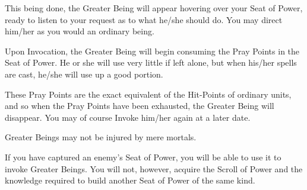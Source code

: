 This being done, the Greater Being will appear hovering over your Seat of Power, ready to listen to your request as to what he/she should do. You may direct him/her as you would an ordinary being.

Upon Invocation, the Greater Being will begin consuming the Pray Points in the Seat of Power. He or she will use very little if left alone, but when his/her spells are cast, he/she will use up a good portion.

These Pray Points are the exact equivalent of the Hit-Points of ordinary units, and so when the Pray Points have been exhausted, the Greater Being will disappear. You may of course Invoke him/her again at a later date.

Greater Beings may not be injured by mere mortals.

If you have captured an enemy’s Seat of Power, you will be able to use it to invoke Greater Beings. You will not, however, acquire the Scroll of Power and the knowledge required to build another Seat of Power of the same kind.